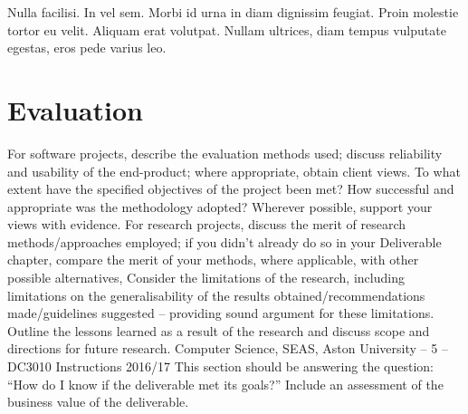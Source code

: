 \begin{savequote}[75mm]
Nulla facilisi. In vel sem. Morbi id urna in diam dignissim feugiat. Proin molestie tortor eu velit. Aliquam erat volutpat. Nullam ultrices, diam tempus vulputate egestas, eros pede varius leo.
\end{savequote}

\chapter{Evaluation}


For software projects, describe the evaluation methods used; discuss reliability
and usability of the end-product; where appropriate, obtain client views. To
what extent have the specified objectives of the project been met? How
successful and appropriate was the methodology adopted? Wherever possible,
support your views with evidence.
For research projects, discuss the merit of research methods/approaches
employed; if you didn’t already do so in your Deliverable chapter, compare the
merit of your methods, where applicable, with other possible alternatives,
Consider the limitations of the research, including limitations on the
generalisability of the results obtained/recommendations made/guidelines
suggested – providing sound argument for these limitations. Outline the
lessons learned as a result of the research and discuss scope and directions for
future research.
Computer Science, SEAS, Aston University – 5 – DC3010 Instructions 2016/17
This section should be answering the question: “How do I know if the
deliverable met its goals?”
Include an assessment of the business value of the deliverable.

